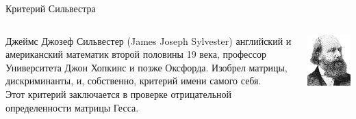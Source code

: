 \documentclass{beamer}
\begin{document}
\begin{frame}{Критерий Сильвестра}

\begin{columns}
\begin{column}{0.5\textwidth}
   \alert{Джеймс Джозеф Сильвестер} (James Joseph Sylvester) английский и американский математик второй половины 19 века, профессор Университета Джон Хопкинс и позже Оксфорда. Изобрел матрицы, дискриминанты, и, собственно, критерий имени самого себя. \\ Этот критерий заключается в проверке отрицательной определенности матрицы Гесса.
\end{column}
\begin{column}{0.5\textwidth}  %
    \begin{center}
     \includegraphics[width=1\textwidth]{sylvester.jpeg}
     \end{center}
\end{column}
\end{columns}

\end{frame}
\end{document}
